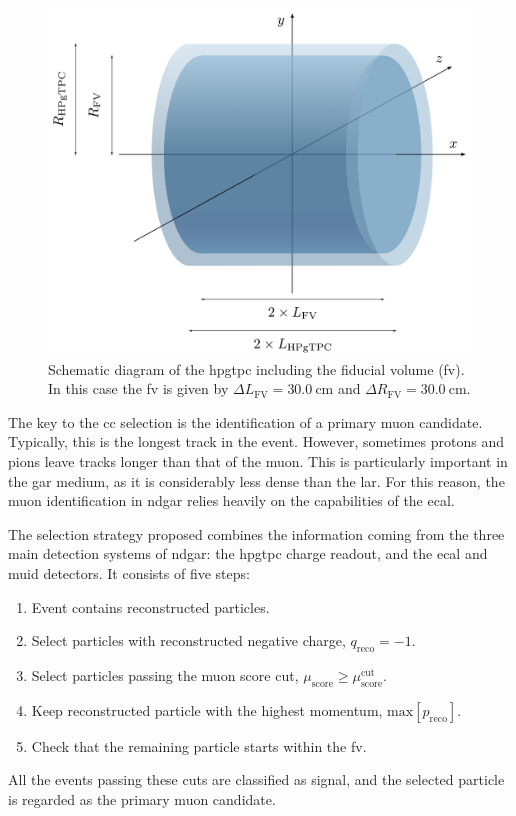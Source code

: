 \begin{figure}[t]
\centering
\includegraphics[width=.90\linewidth]{Images/GAr_selection/ndgar_ana_geometry.pdf}
\caption[Schematic diagram of the \gls{hpgtpc} including the fiducial volume.]{Schematic diagram of the \gls{hpgtpc} including the fiducial volume (\gls{fv}). In this case the \gls{fv} is given by $\Delta L_{\mathrm{FV}} = 30.0 ~ \mathrm{cm}$ and $\Delta R_{\mathrm{FV}} = 30.0 ~ \mathrm{cm}$.}
\label{fig:ndgar_ana_geometry}
\end{figure}

The key to the \gls{cc} selection is the identification of a primary muon candidate. Typically, this is the longest track in the event. However, sometimes protons and pions leave tracks longer than that of the muon. This is particularly important in the \gls{gar} medium, as it is considerably less dense than the \gls{lar}. For this reason, the muon identification in \gls{ndgar} relies heavily on the capabilities of the \gls{ecal}.

The selection strategy proposed combines the information coming from the three main detection systems of \gls{ndgar}: the \gls{hpgtpc} charge readout, and the \gls{ecal} and \gls{muid} detectors. It consists of five steps:
\begin{enumerate}
    \item Event contains reconstructed particles.
    \item Select particles with reconstructed negative charge, $q_{\mathrm{reco}} = -1$.
    \item Select particles passing the muon score cut, $\mu_{\mathrm{score}} \geq \mu_{\mathrm{score}}^{\mathrm{cut}}$.
    \item Keep reconstructed particle with the highest momentum, $\mathrm{max}\left[p_{\mathrm{reco}}\right]$.
    \item Check that the remaining particle starts within the \gls{fv}.
\end{enumerate}
All the events passing these cuts are classified as signal, and the selected particle is regarded as the primary muon candidate.

